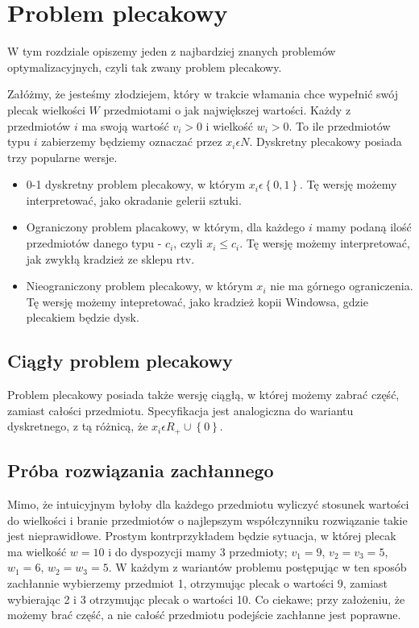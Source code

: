 \section{Problem plecakowy}

\label{sec:plecaki}

W tym rozdziale opiszemy jeden z najbardziej znanych problemów optymalizacyjnych, czyli tak zwany problem plecakowy.

Załóżmy, że jesteśmy złodziejem, który w trakcie włamania chce wypełnić swój plecak wielkości $W$ przedmiotami o jak największej wartości.
Każdy z przedmiotów $i$ ma swoją wartość $v_i> 0$ i wielkość $w_i> 0$.
To ile przedmiotów typu $i$ zabierzemy będziemy oznaczać przez $x_i\epsilon N$.
Dyskretny plecakowy posiada trzy popularne wersje.


\begin{itemize}
  \item 0-1 dyskretny problem plecakowy, w którym $x_i \epsilon \left \{ 0, 1 \right \}$.
  Tę wersję możemy interpretować, jako okradanie gelerii sztuki.
  \item Ograniczony problem placakowy, w którym, dla każdego $i$ mamy podaną ilość przedmiotów danego typu - $c_i$, czyli $x_i \leq c_i$.
  Tę wersję możemy interpretować, jak zwykłą kradzież ze sklepu rtv.
  \item Nieograniczony problem plecakowy, w którym $x_i$ nie ma górnego ograniczenia.
  Tę wersję możemy intepretować, jako kradzież kopii Windowsa, gdzie plecakiem będzie dysk.
\end{itemize}

\subsection{Ciągły problem plecakowy}
Problem plecakowy posiada także wersję ciągłą, w której możemy zabrać część, zamiast całości przedmiotu.
Specyfikacja jest analogiczna do wariantu dyskretnego, z tą różnicą, że $x_i \epsilon R_+ \cup \left \{ 0 \right \}$.

\subsection{Próba rozwiązania zachłannego}
Mimo, że intuicyjnym byłoby dla każdego przedmiotu wyliczyć stosunek wartości do wielkości i branie przedmiotów
o najlepszym współczynniku rozwiązanie takie jest nieprawidłowe.
Prostym kontrprzykładem będzie sytuacja, w której plecak ma wielkość $w = 10$ i do dyspozycji mamy 3 przedmioty;
$v_1=9$, $v_2=v_3=5$, $w_1=6$, $w_2=w_3=5$. W każdym z wariantów problemu postępując w ten sposób zachłannie wybierzemy przedmiot 1,
otrzymując plecak o wartości 9, zamiast wybierając 2 i 3 otrzymując plecak o wartości 10.
Co ciekawe; przy założeniu, że możemy brać część, a nie całość przedmiotu podejście zachłanne jest poprawne.

